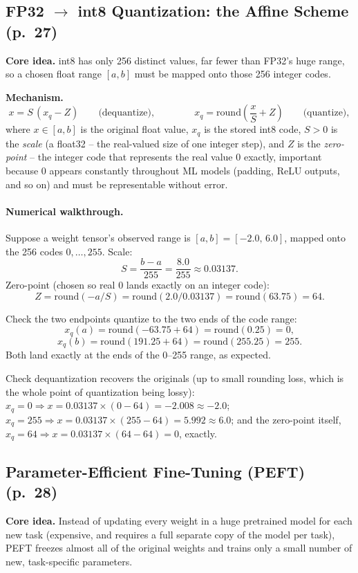 \documentclass[11pt]{article}
\begin{document}
\subsection{FP32 $\to$ int8 Quantization: the Affine Scheme (p.\ 27)}

\textbf{Core idea.} int8 has only 256 distinct values, far fewer than FP32's huge range, so a chosen float range $[a,b]$ must be mapped onto those 256 integer codes.

\textbf{Mechanism.}
\[
x = S\,(x_q - Z) \qquad\text{(dequantize)}, \qquad\qquad x_q = \text{round}\!\left(\frac{x}{S} + Z\right)\qquad\text{(quantize)},
\]
where $x\in[a,b]$ is the original float value, $x_q$ is the stored int8 code, $S>0$ is the \emph{scale} (a float32 -- the real-valued size of one integer step), and $Z$ is the \emph{zero-point} -- the integer code that represents the real value $0$ exactly, important because $0$ appears constantly throughout ML models (padding, ReLU outputs, and so on) and must be representable without error.

\paragraph{Numerical walkthrough.} Suppose a weight tensor's observed range is $[a,b]=[-2.0,\,6.0]$, mapped onto the 256 codes $0,\dots,255$. Scale:
\[
S = \frac{b-a}{255} = \frac{8.0}{255} \approx 0.03137.
\]
Zero-point (chosen so real $0$ lands exactly on an integer code):
\[
Z = \text{round}(-a/S) = \text{round}(2.0/0.03137) = \text{round}(63.75) = 64.
\]

Check the two endpoints quantize to the two ends of the code range:
\[
x_q(a) = \text{round}(-63.75+64)=\text{round}(0.25)=0,
\]
\[
x_q(b)=\text{round}(191.25+64)=\text{round}(255.25)=255.
\]
Both land exactly at the ends of the 0--255 range, as expected.

Check dequantization recovers the originals (up to small rounding loss, which is the whole point of quantization being lossy): $x_q=0 \Rightarrow x=0.03137\times(0-64)=-2.008\approx-2.0$; $x_q=255 \Rightarrow x=0.03137\times(255-64)=5.992\approx6.0$; and the zero-point itself, $x_q=64 \Rightarrow x=0.03137\times(64-64)=0$, exactly.

\subsection{Parameter-Efficient Fine-Tuning (PEFT) (p.\ 28)}

\textbf{Core idea.} Instead of updating every weight in a huge pretrained model for each new task (expensive, and requires a full separate copy of the model per task), PEFT freezes almost all of the original weights and trains only a small number of new, task-specific parameters.
\end{document}
